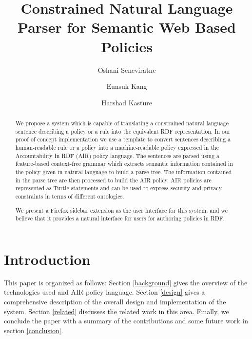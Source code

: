 \documentclass{llncs}
\begin{document}
\title{Constrained Natural Language Parser for Semantic Web Based Policies}

\author{Oshani Seneviratne \and Eunsuk Kang \and Harshad Kasture}


\maketitle
\begin{abstract}

We propose a system which is capable of translating a constrained natural language sentence describing a policy or a rule into the equivalent RDF representation. In our proof of concept implementation we use a template to convert sentences describing a human-readable rule or a policy into a machine-readable policy expressed in the Accountability In RDF (AIR) policy language. The sentences are parsed using a feature-based context-free grammar which extracts semantic information contained in the policy given in natural language to build a parse tree. The information contained in the parse tree are then processed to build the AIR policy. AIR policies are represented as Turtle statements and can be used to express security and privacy constraints in terms of different ontologies.

We present a Firefox sidebar extension as the user interface for this system, and we believe that it provides a natural interface for users for authoring policies in RDF.

\end{abstract}


\section{Introduction}								
\label{sec:intro}

This paper is organized as follows:
Section \ref{background} gives the overview of the technologies used and AIR policy language.  
Section \ref{design} gives a comprehensive description of the overall design and implementation of the system.
Section \ref{related} discusses the related work in this area.
Finally, we conclude the paper with a summary of the contributions and some future work in section \ref{conclusion}.
\end{document}
